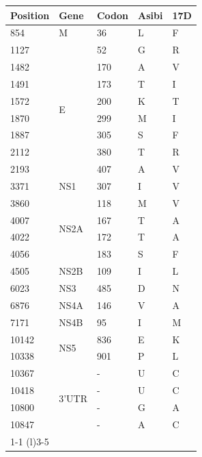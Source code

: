	\begin{tabular}{@{}lllll@{}}
		\toprule
		Position & Gene                   & Codon & Asibi & 17D \\ \midrule
		854      & M                      & 36    & L     & F   \\
		1127     & \multirow{8}{*}{E}     & 52    & G     & R   \\
		1482     &                        & 170   & A     & V   \\
		1491     &                        & 173   & T     & I   \\
		1572     &                        & 200   & K     & T   \\
		1870     &                        & 299   & M     & I   \\
		1887     &                        & 305   & S     & F   \\
		2112     &                        & 380   & T     & R   \\
		2193     &                        & 407   & A     & V   \\
		3371     & NS1                    & 307   & I     & V   \\
		3860     & \multirow{4}{*}{NS2A}  & 118   & M     & V   \\
		4007     &                        & 167   & T     & A   \\
		4022     &                        & 172   & T     & A   \\
		4056     &                        & 183   & S     & F   \\
		4505     & NS2B                   & 109   & I     & L   \\
		6023     & NS3                    & 485   & D     & N   \\
		6876     & NS4A                   & 146   & V     & A   \\
		7171     & NS4B                   & 95    & I     & M   \\
		10142    & \multirow{2}{*}{NS5}   & 836   & E     & K   \\
		10338    &                        & 901   & P     & L   \\
		10367    & \multirow{4}{*}{3'UTR} & -     & U     & C   \\
		10418    &                        & -     & U     & C   \\
		10800    &                        & -     & G     & A   \\
		10847    &                        & -     & A     & C   \\ \cmidrule(r){1-1} \cmidrule(l){3-5} 
	\end{tabular}